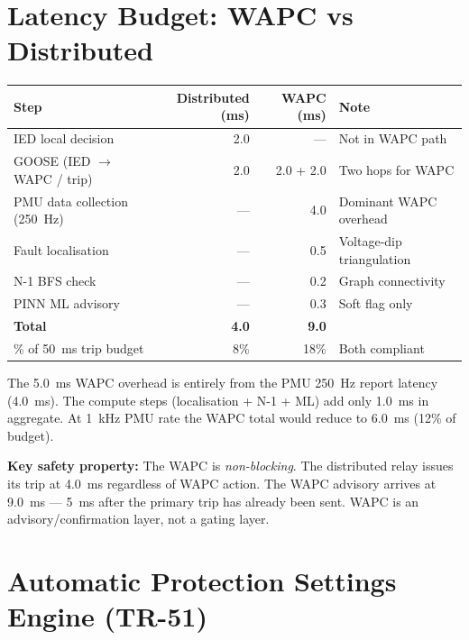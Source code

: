 \documentclass[12pt,a4paper]{article}
\begin{document}
\section{Latency Budget: WAPC vs Distributed}

\begin{center}
\begin{tabular}{@{}lrrl@{}}
\toprule
\textbf{Step} & \textbf{Distributed (ms)} & \textbf{WAPC (ms)} & \textbf{Note} \\
\midrule
IED local decision             & 2.0 & ---         & Not in WAPC path \\
GOOSE (IED $\to$ WAPC / trip)  & 2.0 & 2.0 + 2.0   & Two hops for WAPC \\
PMU data collection (250~Hz)   & --- & 4.0         & Dominant WAPC overhead \\
Fault localisation             & --- & 0.5         & Voltage-dip triangulation \\
N-1 BFS check                  & --- & 0.2         & Graph connectivity \\
PINN ML advisory               & --- & 0.3         & Soft flag only \\
\midrule
\textbf{Total}                 & \textbf{4.0} & \textbf{9.0} & \\
\% of 50~ms trip budget        & 8\%         & 18\%         & Both compliant \\
\bottomrule
\end{tabular}
\end{center}

The 5.0~ms WAPC overhead is entirely from the PMU 250~Hz report latency (4.0~ms). The compute steps (localisation + N-1 + ML) add only 1.0~ms in aggregate. At 1~kHz PMU rate the WAPC total would reduce to 6.0~ms (12\% of budget).

\textbf{Key safety property:} The WAPC is \textit{non-blocking}. The distributed relay issues its trip at 4.0~ms regardless of WAPC action. The WAPC advisory arrives at 9.0~ms — 5~ms after the primary trip has already been sent. WAPC is an advisory/confirmation layer, not a gating layer.

\section{Automatic Protection Settings Engine (TR-51)}
\end{document}
